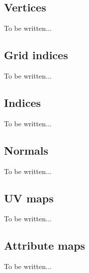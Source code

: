 \subsection{Vertices}
To be written...

\subsection{Grid indices}
To be written...

\subsection{Indices}
To be written...

\subsection{Normals}
To be written...

\subsection{UV maps}
To be written...

\subsection{Attribute maps}
To be written...



